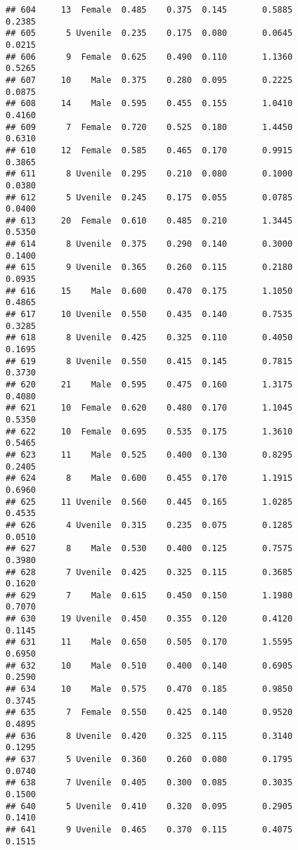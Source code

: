 \documentclass[
]{article}
\begin{document}
\begin{verbatim}
## 604     13  Female  0.485    0.375  0.145       0.5885         0.2385
## 605      5 Uvenile  0.235    0.175  0.080       0.0645         0.0215
## 606      9  Female  0.625    0.490  0.110       1.1360         0.5265
## 607     10    Male  0.375    0.280  0.095       0.2225         0.0875
## 608     14    Male  0.595    0.455  0.155       1.0410         0.4160
## 609      7  Female  0.720    0.525  0.180       1.4450         0.6310
## 610     12  Female  0.585    0.465  0.170       0.9915         0.3865
## 611      8 Uvenile  0.295    0.210  0.080       0.1000         0.0380
## 612      5 Uvenile  0.245    0.175  0.055       0.0785         0.0400
## 613     20  Female  0.610    0.485  0.210       1.3445         0.5350
## 614      8 Uvenile  0.375    0.290  0.140       0.3000         0.1400
## 615      9 Uvenile  0.365    0.260  0.115       0.2180         0.0935
## 616     15    Male  0.600    0.470  0.175       1.1050         0.4865
## 617     10 Uvenile  0.550    0.435  0.140       0.7535         0.3285
## 618      8 Uvenile  0.425    0.325  0.110       0.4050         0.1695
## 619      8 Uvenile  0.550    0.415  0.145       0.7815         0.3730
## 620     21    Male  0.595    0.475  0.160       1.3175         0.4080
## 621     10  Female  0.620    0.480  0.170       1.1045         0.5350
## 622     10  Female  0.695    0.535  0.175       1.3610         0.5465
## 623     11    Male  0.525    0.400  0.130       0.8295         0.2405
## 624      8    Male  0.600    0.455  0.170       1.1915         0.6960
## 625     11 Uvenile  0.560    0.445  0.165       1.0285         0.4535
## 626      4 Uvenile  0.315    0.235  0.075       0.1285         0.0510
## 627      8    Male  0.530    0.400  0.125       0.7575         0.3980
## 628      7 Uvenile  0.425    0.325  0.115       0.3685         0.1620
## 629      7    Male  0.615    0.450  0.150       1.1980         0.7070
## 630     19 Uvenile  0.450    0.355  0.120       0.4120         0.1145
## 631     11    Male  0.650    0.505  0.170       1.5595         0.6950
## 632     10    Male  0.510    0.400  0.140       0.6905         0.2590
## 634     10    Male  0.575    0.470  0.185       0.9850         0.3745
## 635      7  Female  0.550    0.425  0.140       0.9520         0.4895
## 636      8 Uvenile  0.420    0.325  0.115       0.3140         0.1295
## 637      5 Uvenile  0.360    0.260  0.080       0.1795         0.0740
## 638      7 Uvenile  0.405    0.300  0.085       0.3035         0.1500
## 640      5 Uvenile  0.410    0.320  0.095       0.2905         0.1410
## 641      9 Uvenile  0.465    0.370  0.115       0.4075         0.1515

\end{verbatim}
\end{document}
